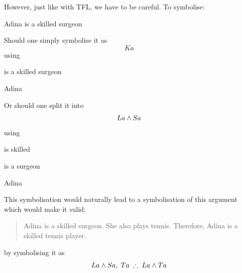 However, just like with TFL, we have to be careful. 
To symbolise:
\begin{samplesent}
	\item\label{sent:skilledsurgeon} Adina is a skilled surgeon
\end{samplesent}
Should one simply symbolise it as
$$Ka$$
using
\begin{ekey}
	\item[Kx]  is a skilled surgeon
	\item[a] Adina
\end{ekey}
Or should one split it into
$$La\mathbin{\wedge} Sa$$
using
\begin{ekey}
	\item[Lx] is skilled
	\item[Sx]  is a surgeon
	\item[a] Adina
\end{ekey}
This symbolisation would naturally lead to a symbolisation of this argument which would make it valid:
\begin{quote}
	Adina is a skilled surgeon. She also plays tennis. Therefore, Adina is a skilled tennis player.
\end{quote}
by symbolising it as $$La\eand Sa,\; Ta\;\therefore\; La\eand Ta$$


